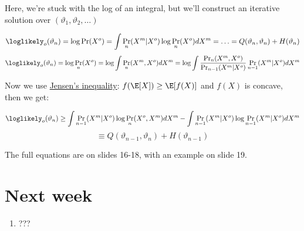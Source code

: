 \documentclass{idc_msc}
\begin{document}
Here, we're stuck with the log of an integral, but we'll construct an iterative solution over $(\vartheta_1,\vartheta_2,\ldots)$

\[\loglikely_o(\vartheta_n)=\log\Pr(X^o)=\int \Pr_n(X^m|X^o) \log \Pr_n(X^o) dX^m=\ldots=Q(\vartheta_n,\vartheta_n)+H(\vartheta_n)\]
\[\loglikely_o(\vartheta_n)=\log\Pr_n(X^o)=\log \int \Pr_n(X^m,X^o) dX^m=\log \int \frac{\Pr_n(X^m, X^o)}{\Pr_{n-1}(X^m|X^o)}\Pr_{n-1}(X^m|X^o)dX^m\]

Now we use \href{https://en.wikipedia.org/wiki/Jensen's_inequality}{Jensen's inequality}: $f(\E[X]) \ge \E[f(X)]$ and $f(X)$ is concave, then we get:

\[\loglikely_o(\vartheta_n) \ge \int \Pr_{n-1}(X^m|X^o) \log \Pr_n(X^o,X^m)dX^m - \int \Pr_{n-1}(X^m|X^o) \log \Pr_{n-1}(X^m|X^o)dX^m\]
\[\equiv Q(\vartheta_{n-1},\vartheta_n) + H(\vartheta_{n-1}) \]

The full equations are on slides 16-18, with an example on slide 19.

\section{Next week}

\begin{enumerate}
  \item ???
\end{enumerate}
\end{document}
